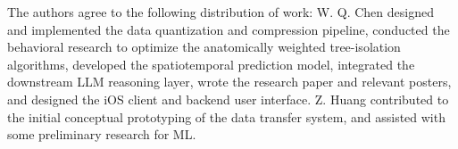 \documentclass[sigconf]{acmart}
\begin{document}
\begin{acks}
The authors agree to the following distribution of work: 
W. Q. Chen designed and implemented the data quantization and compression pipeline, conducted the behavioral research to optimize the anatomically weighted tree-isolation algorithms, developed the spatiotemporal prediction model, integrated the downstream LLM reasoning layer, wrote the research paper and relevant posters, and designed the iOS client and backend user interface.
Z. Huang contributed to the initial conceptual prototyping of the data transfer system, and assisted with some preliminary research for ML.
\end{acks}



\end{document}
